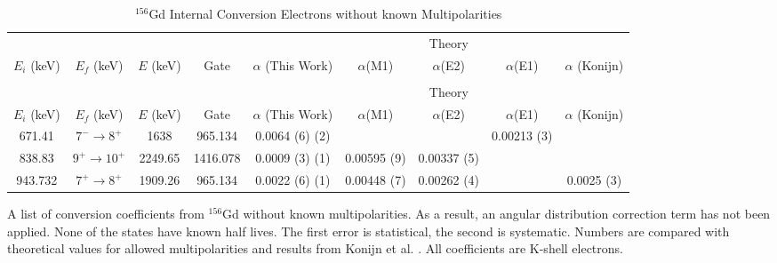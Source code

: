 \begin{landscape}
    \begin{longtable}{c|c|c|c|c|c|c|c|c}
        \caption{$^{156}$Gd Internal Conversion Electrons without known Multipolarities}
        \label{tab:156Gd_No_Mult_ICC}\\
        \toprule
        &	& 	&  &	& \multicolumn{3}{c|}{Theory}	& 	\\
        $E_i$ (keV)	&	$E_f$ (keV)	& $E$ (keV)	&	Gate &		$\alpha$ (This Work)	& $\alpha$(M1) & $\alpha$(E2) & $\alpha$(E1) &	$\alpha$ (Konijn)	\\
        \hline		
        \endfirsthead
        \caption[]{$^{156}$Gd Internal Conversion Electrons without known Multipolarities}\\
        \toprule
        &	& 	&  &	& \multicolumn{3}{c|}{Theory}	& 	\\
        $E_i$ (keV)	&	$E_f$ (keV)	& $E$ (keV)	&	Gate &		$\alpha$ (This Work)	& $\alpha$(M1) & $\alpha$(E2) & $\alpha$(E1) &	$\alpha$ (Konijn)	\\
        \hline		
        \endhead
        671.41	&	$7^-	\rightarrow	8^+$	&	1638	&	965.134	&		0.0064 (6) (2)	& & & 0.00213 (3) &	\\ \hline
        838.83	&	$9^+	\rightarrow	10^+$	&	2249.65	&	1416.078	&	0.0009 (3) (1)	& 0.00595 (9) & 0.00337 (5) & & 	\\ \hline
        943.732	&	$7^+	\rightarrow	8^+$	&	1909.26	&	965.134		&	0.0022 (6) (1) & 0.00448 (7) & 0.00262 (4) & &	0.0025 (3)	\\ 
        \bottomrule
    \end{longtable}
    \caption{A list of conversion coefficients from $^{156}$Gd without known multipolarities. As a result, an angular distribution correction term has not been applied. None of the states have known half lives. The first error is statistical, the second is systematic. Numbers are compared with theoretical values for allowed multipolarities and results from Konijn et al. \citep{konjin81:_156gd}. All coefficients are K-shell electrons.}
\end{landscape}